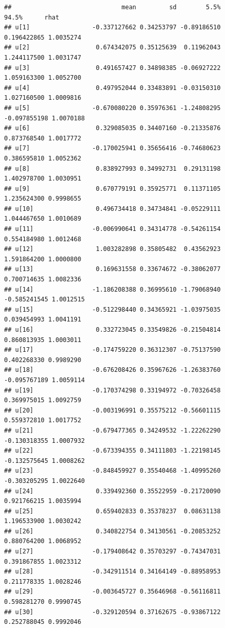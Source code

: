 \documentclass[
]{article}
\begin{document}
\begin{verbatim}
##                              mean         sd        5.5%        94.5%      rhat
## u[1]                 -0.337127662 0.34253797 -0.89186510  0.196422865 1.0035274
## u[2]                  0.674342075 0.35125639  0.11962043  1.244117500 1.0031747
## u[3]                  0.491657427 0.34898385 -0.06927222  1.059163300 1.0052700
## u[4]                  0.497952044 0.33483891 -0.03150310  1.027160500 1.0009816
## u[5]                 -0.670080220 0.35976361 -1.24808295 -0.097855198 1.0070188
## u[6]                  0.329085035 0.34407160 -0.21335876  0.873768540 1.0017772
## u[7]                 -0.170025941 0.35656416 -0.74680623  0.386595810 1.0052362
## u[8]                  0.838927993 0.34992731  0.29131198  1.402978700 1.0030951
## u[9]                  0.670779191 0.35925771  0.11371105  1.235624300 0.9998655
## u[10]                 0.496734418 0.34734841 -0.05229111  1.044467650 1.0010689
## u[11]                -0.006990641 0.34314778 -0.54261154  0.554184980 1.0012468
## u[12]                 1.003282898 0.35805482  0.43562923  1.591864200 1.0000800
## u[13]                 0.169631558 0.33674672 -0.38062077  0.700714635 1.0082336
## u[14]                -1.186208388 0.36995610 -1.79068940 -0.585241545 1.0012515
## u[15]                -0.512298440 0.34365921 -1.03975035  0.039454993 1.0041191
## u[16]                 0.332723045 0.33549826 -0.21504814  0.860813935 1.0003011
## u[17]                -0.174759220 0.36312307 -0.75137590  0.402268330 0.9989290
## u[18]                -0.676208426 0.35967626 -1.26383760 -0.095767189 1.0059114
## u[19]                -0.170374298 0.33194972 -0.70326458  0.369975015 1.0092759
## u[20]                -0.003196991 0.35575212 -0.56601115  0.559372810 1.0017752
## u[21]                -0.679477365 0.34249532 -1.22262290 -0.130318355 1.0007932
## u[22]                -0.673394355 0.34111803 -1.22198145 -0.132575645 1.0008262
## u[23]                -0.848459927 0.35540468 -1.40995260 -0.303205295 1.0022640
## u[24]                 0.339492360 0.35522959 -0.21720090  0.921766215 1.0035994
## u[25]                 0.659402833 0.35378237  0.08631138  1.196533900 1.0030242
## u[26]                 0.340822754 0.34130561 -0.20853252  0.880764200 1.0068952
## u[27]                -0.179408642 0.35703297 -0.74347031  0.391867855 1.0023312
## u[28]                -0.342911514 0.34164149 -0.88958953  0.211778335 1.0028246
## u[29]                -0.003645727 0.35646968 -0.56116811  0.598281270 0.9990745
## u[30]                -0.329120594 0.37162675 -0.93867122  0.252788045 0.9992046

\end{verbatim}
\end{document}
